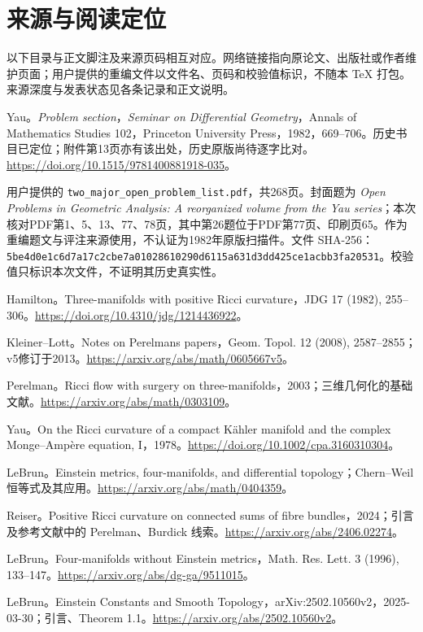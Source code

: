 \documentclass[11pt,a4paper]{article}
\theoremstyle{definition}
\begin{document}
\section{来源与阅读定位}
以下目录与正文脚注及来源页码相互对应。网络链接指向原论文、出版社或作者维护页面；用户提供的重编文件以文件名、页码和校验值标识，不随本 TeX 打包。来源深度与发表状态见各条记录和正文说明。
\begin{enumerate}[label={[\arabic*]},leftmargin=2.2em,itemsep=0.55em]
\raggedright
\item Yau。\emph{Problem section}，\emph{Seminar on Differential Geometry}，Annals of Mathematics Studies 102，Princeton University Press，1982，669--706。历史书目已定位；附件第13页亦有该出处，历史原版尚待逐字比对。\url{https://doi.org/10.1515/9781400881918-035}。
\item 用户提供的 \texttt{two\_major\_open\_problem\_list.pdf}，共268页。封面题为 \emph{Open Problems in Geometric Analysis: A reorganized volume from the Yau series}；本次核对PDF第1、5、13、77、78页，其中第26题位于PDF第77页、印刷页65。作为重编题文与评注来源使用，不认证为1982年原版扫描件。文件 SHA-256：\nolinkurl{5be4d0e1c6d7a17c2cbe7a01028610290d6115a631d3dd425ce1acbb3fa20531}。校验值只标识本次文件，不证明其历史真实性。
\item Hamilton。Three-manifolds with positive Ricci curvature，JDG 17 (1982), 255--306。\url{https://doi.org/10.4310/jdg/1214436922}。
\item Kleiner--Lott。Notes on Perelman\textquotesingle s papers，Geom. Topol. 12 (2008), 2587--2855；v5修订于2013。\url{https://arxiv.org/abs/math/0605667v5}。
\item Perelman。Ricci flow with surgery on three-manifolds，2003；三维几何化的基础文献。\url{https://arxiv.org/abs/math/0303109}。
\item Yau。On the Ricci curvature of a compact Kähler manifold and the complex Monge--Ampère equation, I，1978。\url{https://doi.org/10.1002/cpa.3160310304}。
\item LeBrun。Einstein metrics, four-manifolds, and differential topology；Chern--Weil 恒等式及其应用。\url{https://arxiv.org/abs/math/0404359}。
\item Reiser。Positive Ricci curvature on connected sums of fibre bundles，2024；引言及参考文献中的 Perelman、Burdick 线索。\url{https://arxiv.org/abs/2406.02274}。
\item LeBrun。Four-manifolds without Einstein metrics，Math. Res. Lett. 3 (1996), 133--147。\url{https://arxiv.org/abs/dg-ga/9511015}。
\item LeBrun。Einstein Constants and Smooth Topology，arXiv:2502.10560v2，2025-03-30；引言、Theorem 1.1。\url{https://arxiv.org/abs/2502.10560v2}。

\end{enumerate}
\end{document}
